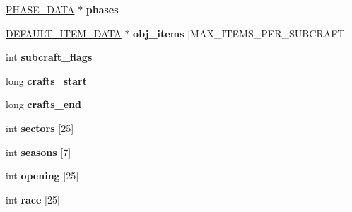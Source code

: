 \begin{DoxyCompactItemize}
\item 
\hypertarget{structsubcraft__head__data_a4a9bb7499c38bbf7cbdb058af3730368}{\hyperlink{structphase__data}{P\-H\-A\-S\-E\-\_\-\-D\-A\-T\-A} $\ast$ {\bfseries phases}}\label{structsubcraft__head__data_a4a9bb7499c38bbf7cbdb058af3730368}

\item 
\hypertarget{structsubcraft__head__data_a9ff897339a8a2b76583e84dac02527e7}{\hyperlink{structdefault__item__data}{D\-E\-F\-A\-U\-L\-T\-\_\-\-I\-T\-E\-M\-\_\-\-D\-A\-T\-A} $\ast$ {\bfseries obj\-\_\-items} \mbox{[}M\-A\-X\-\_\-\-I\-T\-E\-M\-S\-\_\-\-P\-E\-R\-\_\-\-S\-U\-B\-C\-R\-A\-F\-T\mbox{]}}\label{structsubcraft__head__data_a9ff897339a8a2b76583e84dac02527e7}

\item 
\hypertarget{structsubcraft__head__data_a5f1abb33f003ee3237e0f21d688c88c3}{int {\bfseries subcraft\-\_\-flags}}\label{structsubcraft__head__data_a5f1abb33f003ee3237e0f21d688c88c3}

\item 
\hypertarget{structsubcraft__head__data_ab2bb385dfa4befa102ec9d12113a8c2a}{long {\bfseries crafts\-\_\-start}}\label{structsubcraft__head__data_ab2bb385dfa4befa102ec9d12113a8c2a}

\item 
\hypertarget{structsubcraft__head__data_a8e663fb7427df5c18ae5342d69a9c372}{long {\bfseries crafts\-\_\-end}}\label{structsubcraft__head__data_a8e663fb7427df5c18ae5342d69a9c372}

\item 
\hypertarget{structsubcraft__head__data_a8c67496c6d5f2f03bb06196c50c0b102}{int {\bfseries sectors} \mbox{[}25\mbox{]}}\label{structsubcraft__head__data_a8c67496c6d5f2f03bb06196c50c0b102}

\item 
\hypertarget{structsubcraft__head__data_a136a6ced49dd19380d6c096801f6dd33}{int {\bfseries seasons} \mbox{[}7\mbox{]}}\label{structsubcraft__head__data_a136a6ced49dd19380d6c096801f6dd33}

\item 
\hypertarget{structsubcraft__head__data_a5bf25f461e22277f260ec970443104fe}{int {\bfseries opening} \mbox{[}25\mbox{]}}\label{structsubcraft__head__data_a5bf25f461e22277f260ec970443104fe}

\item 
\hypertarget{structsubcraft__head__data_a5976bc6902c4faf452da74285f5a7200}{int {\bfseries race} \mbox{[}25\mbox{]}}\label{structsubcraft__head__data_a5976bc6902c4faf452da74285f5a7200}


\end{DoxyCompactItemize}

